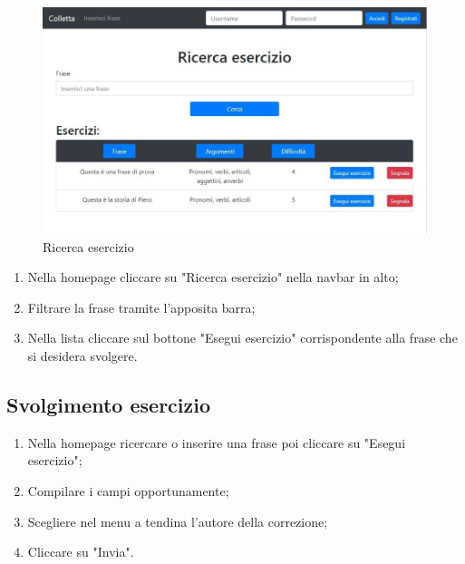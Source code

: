 \documentclass[11pt,a4paper]{article}
\begin{document}
{	\begin{figure}[h]
		\centering
		\includegraphics[scale=0.65]{images/ricerca.jpg}
		\caption{Ricerca esercizio}
	\end{figure}

	\begin{enumerate}
		\item Nella homepage cliccare su "Ricerca esercizio" nella navbar in alto;
		\item Filtrare la frase tramite l'apposita barra;
		\item Nella lista cliccare sul bottone "Esegui esercizio" corrispondente alla frase che si desidera svolgere.
	\end{enumerate}
	
	\subsection{Svolgimento esercizio}
	\begin{enumerate}
		\item Nella homepage ricercare o inserire una frase poi cliccare su "Esegui esercizio";
		\item Compilare i campi opportunamente;
		\item Scegliere nel menu a tendina l'autore della correzione;
		\item Cliccare su "Invia".
	\end{enumerate}
	\newpage

}
\end{document}
